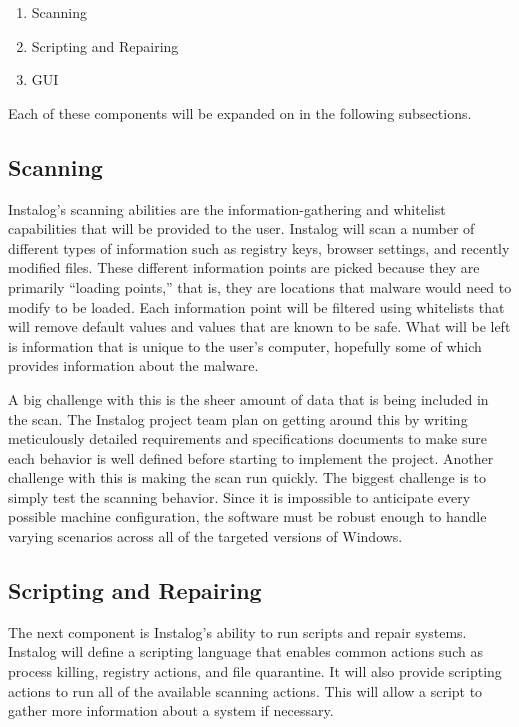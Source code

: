 \documentclass[letterpaper,12pt]{article}
\begin{document}
\begin{enumerate}
  \item Scanning
  \item Scripting and Repairing
  \item GUI
\end{enumerate}

Each of these components will be expanded on in the following subsections.

\subsection{Scanning}
Instalog's scanning abilities are the information-gathering and whitelist
capabilities that will be provided to the user.  Instalog will scan a number of
different types of information such as registry keys, browser settings, and
recently modified files.  These different information points are picked because
they are primarily ``loading points,'' that is, they are locations that malware
would need to modify to be loaded.  Each information point will be filtered
using whitelists that will remove default values and values that are known to be
safe.  What will be left is information that is unique to the user's computer,
hopefully some of which provides information about the malware.

A big challenge with this is the sheer amount of data that is being included in
the scan.  The Instalog project team plan on getting around this by writing
meticulously detailed requirements and specifications documents to make sure
each behavior is well defined before starting to implement the project.
Another challenge with this is making the scan run quickly.  The biggest
challenge is to simply test the scanning behavior.  Since it is impossible to
anticipate every possible machine configuration, the software must be robust
enough to handle varying scenarios across all of the targeted versions of
Windows.

\subsection{Scripting and Repairing}
The next component is Instalog's ability to run scripts and repair systems. 
Instalog will define a scripting language that enables common actions such as
process killing, registry actions, and file quarantine.  It will also provide
scripting actions to run all of the available scanning actions.  This will allow
a script to gather more information about a system if necessary.  
\end{document}
